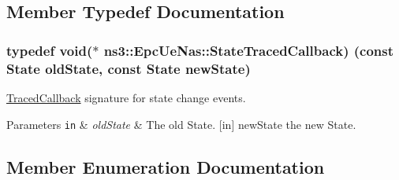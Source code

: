 \subsection{Member Typedef Documentation}
\subsubsection[{\texorpdfstring{State\+Traced\+Callback}{StateTracedCallback}}]{\setlength{\rightskip}{0pt plus 5cm}typedef void($\ast$  ns3\+::\+Epc\+Ue\+Nas\+::\+State\+Traced\+Callback) (const {\bf State} old\+State, const {\bf State} new\+State)}\hypertarget{classns3_1_1EpcUeNas_afa8d2efdc3cdbd99fe97d99a5ae34ffd}{}\label{classns3_1_1EpcUeNas_afa8d2efdc3cdbd99fe97d99a5ae34ffd}
\hyperlink{classns3_1_1TracedCallback}{Traced\+Callback} signature for state change events.


\begin{DoxyParams}[1]{Parameters}
\mbox{\tt in}  & {\em old\+State} & The old State.  \mbox{[}in\mbox{]} new\+State the new State. \\
\hline
\end{DoxyParams}


\subsection{Member Enumeration Documentation}
